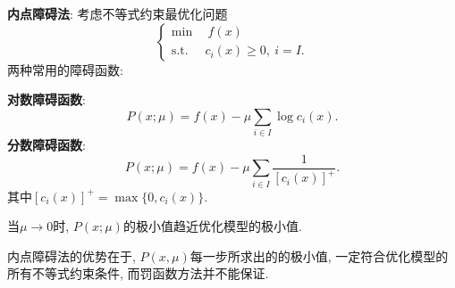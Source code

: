 \documentclass[12pt, a4paper, oneside]{ctexart}
\let\geq=\geqslant %
\begin{document}
\textbf{内点障碍法}: 考虑不等式约束最优化问题
\begin{equation*}
    \left\{\begin{aligned}
        \min &\ \ f(x)\\
        \text{s.t.}&\ c_i(x)\geq 0,\ i=I.
    \end{aligned}\right.
\end{equation*}
两种常用的障碍函数:

\textbf{对数障碍函数}: 
\begin{equation*}
    P(x;\mu) = f(x)-\mu\sum_{i\in I}\log c_i(x).
\end{equation*}
\textbf{分数障碍函数}:
\begin{equation*}
    P(x;\mu) = f(x)-\mu\sum_{i\in I}\frac{1}{[c_i(x)]^+}.
\end{equation*}
其中$[c_i(x)]^+ = \max\{0,c_i(x)\}$.

当$\mu\to 0$时, $P(x;\mu)$的极小值趋近优化模型的极小值. 

内点障碍法的优势在于, $P(x,\mu)$每一步所求出的的极小值, 一定符合优化模型的所有不等式约束条件, 而罚函数方法并不能保证.

\iffalse
\centerline{
    \texttt{[image: figure.png]}
}
\renewcommand\arraystretch{0.8} %
\begin{table}[!htbp] %
    \centering %
    \begin{tabular}{p{1cm}<{\centering}p{1cm}<{\centering}p{3cm}<{\centering}p{5cm}<{\centering}} %
        \toprule
        $x_i$ & $f[x_1]$ & $f[x_i,x_{i+1}]$ & $f[x_i,x_{i+1},x_{i+2}]$ \\
        \midrule
        $x_0$ & $f(x_0)$ &                  &                          \\
        $x_0$ & $f(x_0)$ & $f'(x_0)$        &                          \\
        $x_0$ & $f(x_1)$ & $\frac{f(x_1)-f(x_0)}{x_1-x_0}$ & $\frac{f(x_1)-f(x_0)}{(x_1-x_0)^2}-\frac{f'(x_0)}{x_1-x_0}$\\
        \bottomrule
    \end{tabular}
\end{table}

\def\Log{\text{Log}} %
$\Log$ %
\fi
\end{document}
